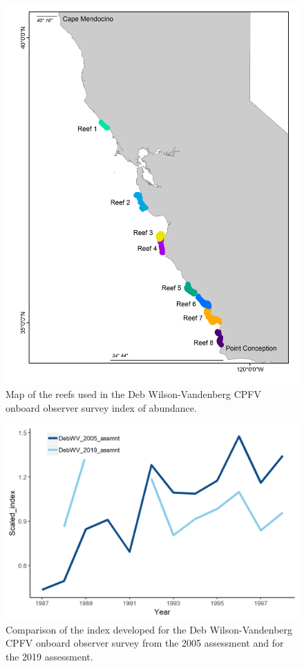 \documentclass[12pt,]{article}
\begin{document}
\begin{figure}
\centering
\includegraphics{Figures/DebWV_sites.png}
\caption{Map of the reefs used in the Deb Wilson-Vandenberg CPFV onboard
observer survey index of abundance. \label{fig:DebWV_sites}}
\end{figure}

\begin{figure}
\centering
\includegraphics{Figures/DebWV_index_compare.png}
\caption{Comparison of the index developed for the Deb Wilson-Vandenberg
CPFV onboard observer survey from the 2005 assessment and for the 2019
assessment. \label{fig:DebWV_index_compare}}
\end{figure}
\end{document}
